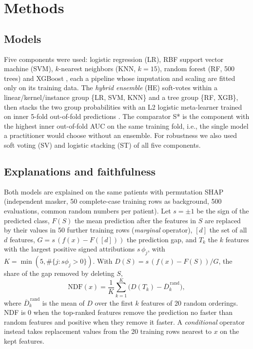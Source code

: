 \section{Methods}
\subsection{Models}
Five components were used: logistic regression (LR), RBF support vector machine (SVM), $k$-nearest neighbors (KNN, $k{=}15$), random forest (RF, 500 trees) and XGBoost \cite{xgboost}, each a pipeline whose imputation and scaling are fitted only on its training data. The \emph{hybrid ensemble} (HE) soft-votes within a linear/kernel/instance group \{LR, SVM, KNN\} and a tree group \{RF, XGB\}, then stacks the two group probabilities with an L2 logistic meta-learner trained on inner 5-fold out-of-fold predictions \cite{wolpert}. The comparator S* is the component with the highest inner out-of-fold AUC on the same training fold, i.e., the single model a practitioner would choose without an ensemble. For robustness we also used soft voting (SV) and logistic stacking (ST) of all five components.

\subsection{Explanations and faithfulness}
Both models are explained on the same patients with permutation SHAP (independent masker, 50 complete-case training rows as background, 500 evaluations, common random numbers per patient). Let $s=\pm1$ be the sign of the predicted class, $F(S)$ the mean prediction after the features in $S$ are replaced by their values in 50 further training rows (\emph{marginal} operator), $[d]$ the set of all $d$ features, $G=s\,(f(x)-F([d]))$ the prediction gap, and $T_k$ the $k$ features with the largest positive signed attributions $s\,\phi_j$, with $K=\min(5, \#\{j: s\phi_j>0\})$. With $D(S)=s\,(f(x)-F(S))/G$, the share of the gap removed by deleting $S$,
\begin{equation}
\mathrm{NDF}(x)=\frac{1}{K}\sum_{k=1}^{K}\Big(D(T_k)-\overline{D}^{\,\mathrm{rand}}_k\Big),
\end{equation}
where $\overline{D}^{\,\mathrm{rand}}_k$ is the mean of $D$ over the first $k$ features of 20 random orderings. NDF is 0 when the top-ranked features remove the prediction no faster than random features and positive when they remove it faster. A \emph{conditional} operator instead takes replacement values from the 20 training rows nearest to $x$ on the kept features.

